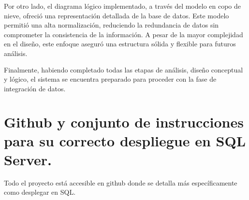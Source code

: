 \documentclass[12pt, a4paper, twoside]{article}
\begin{document}
	Por otro lado, el diagrama lógico implementado, a través del modelo en copo de nieve, ofreció una representación detallada de la base de datos. Este modelo permitió una alta normalización, reduciendo la redundancia de datos sin comprometer la consistencia de la información. A pesar de la mayor complejidad en el diseño, este enfoque aseguró una estructura sólida y flexible para futuros análisis.
	
	Finalmente, habiendo completado todas las etapas de análisis, diseño conceptual y lógico, el sistema se encuentra preparado para proceder con la fase de integración de datos. 
	


	\section{Github y conjunto de instrucciones para su correcto despliegue en SQL Server.}

	Todo el proyecto está accesible en github \cite{depab2024} donde se detalla más específicamente como desplegar en SQL.
	\printbibliography
	
	
	
	
\end{document}
